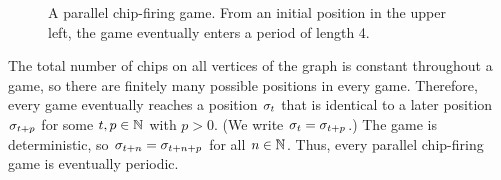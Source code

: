 \begin{centering}
\begin{figure}[h]
  \caption{A parallel chip-firing game. From an initial position in the upper
    left, the game eventually enters a period of length 4.}
  \label{example}
\end{figure}
\end{centering}

The total number of chips on all vertices of the graph is constant throughout a
game, so there are finitely many possible positions in every game. Therefore,
every game eventually reaches a position $\sigma_{t}$ that is identical to a later
position $\sigma_{t+p}$ for some $t,p \in \mathbb{N}$ with $p > 0$. (We write $\sigma_{t}
= \sigma_{t+p}$.) The game is deterministic, so $\sigma_{t+n} = \sigma_{t+n+p}$ for all
$n \in \mathbb{N}$. Thus, every parallel chip-firing game is eventually periodic.

